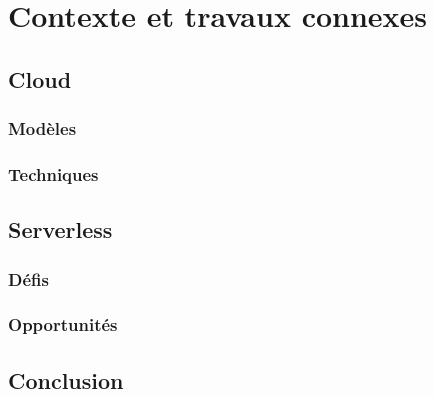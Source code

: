 \clearemptydoublepage
\chapter{Contexte et travaux connexes}

\section{Cloud}

\subsection{Modèles}

\subsection{Techniques}

\section{Serverless}

\subsection{Défis}

\subsection{Opportunités}

\section{Conclusion}
